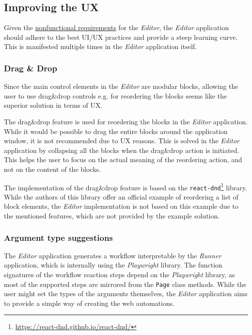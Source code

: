 
\subsection{Improving the \acs{UX}}
Given the \hyperref[requirements]{nonfunctional requirements} for the \textit{Editor}, the \textit{Editor} application should adhere to the best \ac{UI}/\ac{UX} practices and provide a steep learning curve.
This is manifested multiple times in the \textit{Editor} application itself.


\subsubsection{Drag \& Drop}
Since the main control elements in the \textit{Editor} are modular blocks, allowing the user to use drag\&drop controls e.g. for reordering the blocks seems like the superior solution in terms of UX.

The drag\&drop feature is used for reordering the blocks in the \textit{Editor} application.
While it would be possible to drag the entire blocks around the application window, it is not recommended due to UX reasons.
This is solved in the \textit{Editor} application by collapsing all the blocks when the drag\&drop action is initiated.
This helps the user to focus on the actual meaning of the reordering action, and not on the content of the blocks.

The implementation of the drag\&drop feature is based on the \texttt{react-dnd}\footnote{\url{https://react-dnd.github.io/react-dnd/}} library.
While the authors of this library offer an official example of reordering a list of block elements, the \textit{Editor} implementation is not based on this example due to the mentioned features,
which are not provided by the example solution.

\subsubsection{Argument type suggestions}
The \textit{Editor} application generates a workflow interpretable by the \textit{Runner} application, which is internally using the \textit{Playwright} library.
The function signatures of the workflow reaction steps depend on the \textit{Playwright} library, as most of the supported steps are mirrored from the \texttt{Page} class methods.
While the user might set the types of the arguments themselves, the \textit{Editor} application aims to provide a simple way of creating the web automations.

